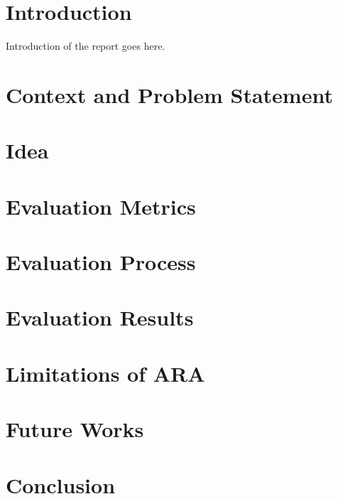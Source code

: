 \section{Introduction}
Introduction of the report goes here. 


\section{Context and Problem Statement}


\section{Idea}

\section{Evaluation Metrics}


\section{Evaluation Process}

\section{Evaluation Results}

\section{Limitations of ARA}

\section{Future Works}

\section{Conclusion}

